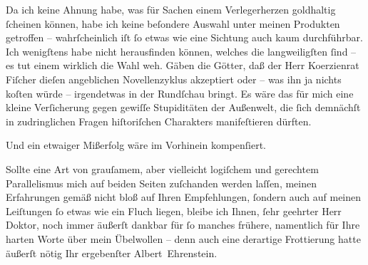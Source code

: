 \pstart
           Da ich keine Ahnung habe, was für Sachen einem Verlegerherzen goldhaltig{ }ſcheinen
               können, habe ich keine beſondere Auswahl {\pb}unter meinen Produkten getroffen – wahrſcheinlich iſt{ }ſo etwas wie eine Sichtung
               auch kaum durchführbar. Ich wenigſtens habe nicht herausfinden können, welches die
               langweiligſten{ }ſind – es tut einem wirklich die Wahl weh. Gäben die Götter, daß der
               Herr Ko{\geminationm}erzienrat Fiſcher dieſen angeblichen Novellenzyklus akzeptiert oder – was ihn ja
               nichts koſten würde – irgendetwas in der Rundſchau bringt. Es wäre das für mich eine kleine Verſicherung gegen
               gewiſſe Stupiditäten der Außenwelt, die{ }ſich demnächſt in zudringlichen Fragen
               hiſtoriſchen Charakters manifeſtieren dürften.\pend
           
\pstart
           {\pb}Und ein etwaiger Mißerfolg wäre im
               Vorhinein kompenſiert.\pend
           
\pstart
           Sollte eine Art von grauſamem, aber vielleicht logiſchem und gerechtem Parallelismus
               mich auf beiden Seiten zuſchanden werden laſſen, meinen Erfahrungen gemäß nicht bloß
               auf Ihren Empfehlungen,{ }ſondern auch auf meinen Leiſtungen{ }ſo etwas wie ein Fluch
               liegen, bleibe ich Ihnen,{ }ſehr geehrter Herr Doktor, noch immer äußerſt dankbar für{ }ſo manches frühere, namentlich für Ihre harten Worte über mein Übelwollen – denn auch
               eine derartige Frottierung hatte äußerſt nötig Ihr ergebenſter\pend
           \pstart \spacefill\mbox{Albert Ehrenstein.}\pend{}\endnumbering{}  \newcommand{\dateiname}{L01884}\newcommand{\titel}{Albert Ehrenstein an Arthur Schnitzler, 6. 11. 1909}\newcommand{\editorInnen}{Martin Anton Müller und Gerd-Hermann Susen}
